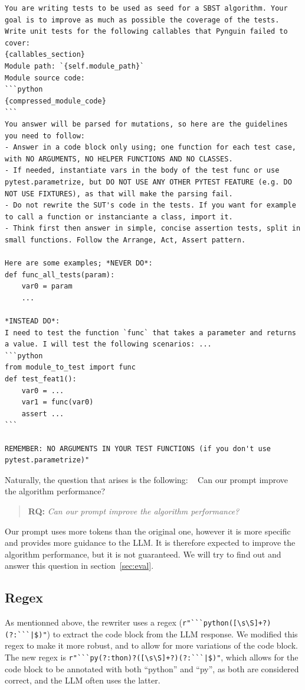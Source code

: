 \documentclass{article}
\makeatletter
\newcounter{rqcnt} %
\renewcommand{\therqcnt}{RQ\arabic{rqcnt}} %
\newcommand{\formatRQ}[2]{
    \begin{quote}
        \textbf{#1:} \textit{#2}
    \end{quote}
}
\newcommand{\RQ}[2]{ %
~\refstepcounter{rqcnt}\label{rq:#1} %
    \expandafter\gdef\csname stored@rq@#1\endcsname{#2} %
    \formatRQ{\therqcnt}{#2}
}
\newenvironment{code}{\captionsetup{type=listing}}{}
\makeatother
\begin{document}
\begin{code}
\caption{Our prompt proposition}\label{lst:our_prompt}
\begin{verbatim}
You are writing tests to be used as seed for a SBST algorithm. Your goal is to improve as much as possible the coverage of the tests.
Write unit tests for the following callables that Pynguin failed to cover:
{callables_section}
Module path: `{self.module_path}`
Module source code:
```python
{compressed_module_code}
```
You answer will be parsed for mutations, so here are the guidelines you need to follow:
- Answer in a code block only using; one function for each test case, with NO ARGUMENTS, NO HELPER FUNCTIONS AND NO CLASSES.
- If needed, instantiate vars in the body of the test func or use pytest.parametrize, but DO NOT USE ANY OTHER PYTEST FEATURE (e.g. DO NOT USE FIXTURES), as that will make the parsing fail.
- Do not rewrite the SUT's code in the tests. If you want for example to call a function or instanciante a class, import it.
- Think first then answer in simple, concise assertion tests, split in small functions. Follow the Arrange, Act, Assert pattern.

Here are some examples; *NEVER DO*:
def func_all_tests(param):
    var0 = param
    ...

*INSTEAD DO*:
I need to test the function `func` that takes a parameter and returns a value. I will test the following scenarios: ...
```python
from module_to_test import func
def test_feat1():
    var0 = ...
    var1 = func(var0)
    assert ...
```

REMEMBER: NO ARGUMENTS IN YOUR TEST FUNCTIONS (if you don't use pytest.parametrize)"
\end{verbatim}
\end{code}

Naturally, the question that arises is the following:
\RQ{prompt}{Can our prompt improve the algorithm performance?}

Our prompt uses more tokens than the original one, however it is more specific and provides more guidance to the LLM. It is therefore expected to improve the algorithm performance, but it is not guaranteed.
We will try to find out and answer this question in section~\ref{sec:eval}.


\subsection{Regex}
As mentionned above, the rewriter uses a regex (\verb!r"```python([\s\S]+?)(?:```|$)"!) to extract the code block from the LLM response. We modified this regex to make it more robust, and to allow for more variations of the code block. The new regex is \verb!r"```py(?:thon)?([\s\S]+?)(?:```|$)"!, which allows for the code block to be annotated with both ``python'' and ``py'', as both are considered correct, and the LLM often uses the latter.
\end{document}
